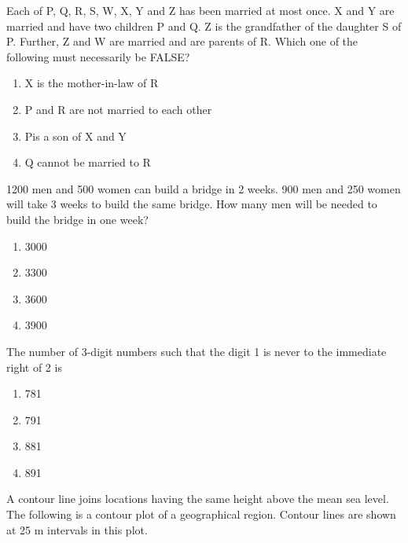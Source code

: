 \item Each of P, Q, R, S, W, X, Y and Z has been married at most once. X and Y are married and have two children P and Q. Z is the grandfather of the daughter S of P. Further, Z and W are married and are parents of R. Which one of the following must necessarily be FALSE?
\begin{enumerate}
    \item X is the mother-in-law of R
    \item P and R are not married to each other
    \item Pis a son of X and Y
    \item Q cannot be married to R
\end{enumerate}
\item 1200 men and 500 women can build a bridge in 2 weeks. 900 men and 250 women will take 3 weeks to build the same bridge. How many men will be needed to build the bridge in one week?
\begin{enumerate}
    \item 3000
    \item 3300
    \item 3600
    \item 3900
\end{enumerate}
\item The number of 3-digit numbers such that the digit 1 is never to the immediate right of 2 is
\begin{enumerate}
    \item 781
    \item 791
    \item 881
    \item 891
\end{enumerate}
\item A contour line joins locations having the same height above the mean sea level. The following is a contour plot of a geographical region. Contour lines are shown at 25 m intervals in this plot.
